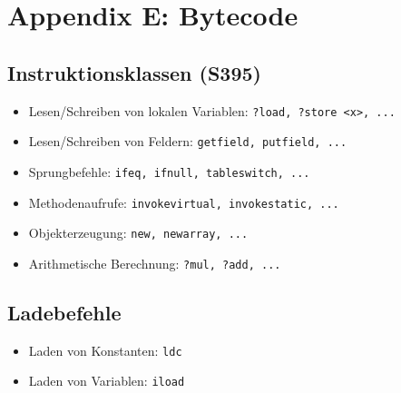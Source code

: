 \section{Appendix E: Bytecode}

\subsection{Instruktionsklassen (S395)}
\begin{itemize}
	\item Lesen/Schreiben von lokalen Variablen: \texttt{?load, ?store <x>, ...}
	\item Lesen/Schreiben von Feldern: \texttt{getfield, putfield, ...}
	\item Sprungbefehle: \texttt{ifeq, ifnull, tableswitch, ...}
	\item Methodenaufrufe: \texttt{invokevirtual, invokestatic, ...}
	\item Objekterzeugung: \texttt{new, newarray, ...}
	\item Arithmetische Berechnung: \texttt{?mul, ?add, ...}
\end{itemize}

\subsection{Ladebefehle}
\begin{itemize}
	\item Laden von Konstanten: \texttt{ldc}
	\item Laden von Variablen: \texttt{iload}
\end{itemize}